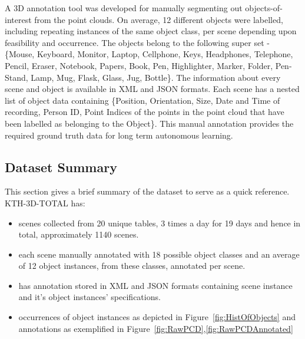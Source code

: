 \documentclass[letterpaper, 10 pt, conference]{ieeeconf}  %
\begin{document}
A 3D annotation tool was developed for manually segmenting out objects-of-interest from the point clouds. On average, 12 different objects 
were labelled, including repeating instances of the same object class, per scene depending upon feasibility and occurrence. The objects 
belong to the following super set - \{Mouse, Keyboard, Monitor, Laptop, Cellphone, Keys, Headphones, Telephone, Pencil, Eraser, Notebook, 
Papers,  Book, Pen, Highlighter, Marker, Folder, Pen-Stand, Lamp, Mug, Flask, Glass, Jug, Bottle\}. The information about every scene and 
object is available in  XML and JSON formats. Each scene has a nested list of object data containing \{Position, Orientation, Size, Date and 
Time of recording, Person ID, Point Indices of the points in the point cloud that have been labelled as belonging to the Object\}. This 
manual annotation provides the required ground truth data for long term autonomous learning.

\subsection{Dataset Summary}
\label{ssec:Dataset Summary}
This section gives a brief summary of the dataset to serve as a quick reference.
\noindent KTH-3D-TOTAL has:
\begin{itemize}
	\item scenes collected from 20 unique tables, 3 times a day for 19 days and hence in total, approximately 1140 scenes.
	\item each scene manually annotated with 18 possible object classes and an average of 12 object instances, from these classes, annotated per scene.
	\item has annotation stored in XML and JSON formats containing scene instance and it's object instances' specifications.
	\item occurrences of object instances as depicted in Figure~\ref{fig:HistOfObjects} and annotations as exemplified in Figure~\ref{fig:RawPCD},\ref{fig:RawPCDAnnotated}
\end{itemize}
\end{document}
